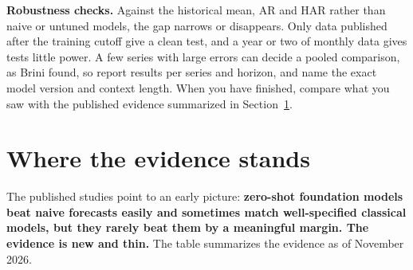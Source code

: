 \label{sec:21-stress}
\textbf{Robustness checks.} Against the historical mean, AR and HAR rather than naive or untuned models, the gap narrows or disappears. Only data published after the training cutoff give a clean test, and a year or two of monthly data gives tests little power. A few series with large errors can decide a pooled comparison, as Brini found, so report results per series and horizon, and name the exact model version and context length. When you have finished, compare what you saw with the published evidence summarized in Section~\ref{sec:21-verdict}.

\section{Where the evidence stands}
\label{sec:21-verdict}

The published studies point to an early picture: \textbf{zero-shot foundation models beat naive forecasts easily and sometimes match well-specified classical models, but they rarely beat them by a meaningful margin. The evidence is new and thin.} The table summarizes the evidence as of November 2026.

